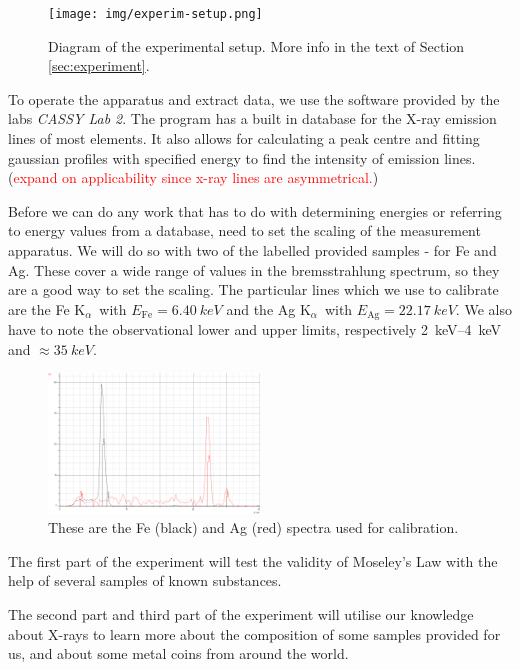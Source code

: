 \documentclass[11pt,a4paper,twoside,onecolumn]{article}
\newcommand{\reminder}[1]{\textcolor{red}{#1}}
\newcommand{\Kalpha}{$\mathrm{K}_\alpha$~}
\begin{document}
\begin{figure}[!htbp]
    \centering
    \texttt{[image: img/experim-setup.png]}
    \caption{Diagram of the experimental setup. More info in the text of Section \ref{sec:experiment}.}\label{fig:experim-setup}
\end{figure}

To operate the apparatus and extract data, we use the software provided by the labs \emph{CASSY Lab 2}. The program has a built in database for the X-ray emission lines of most elements. It also allows for calculating a peak centre and fitting gaussian profiles with specified energy to find the intensity of emission lines. (\reminder{expand on applicability since x-ray lines are asymmetrical.})

Before we can do any work that has to do with determining energies or referring to energy values from a database, need to set the scaling of the measurement apparatus. We will do so with two of the labelled provided samples - for Fe and Ag. These cover a wide range of values in the bremsstrahlung spectrum, so they are a good way to set the scaling. The particular lines which we use to calibrate are the Fe \Kalpha with $E_\mathrm{Fe} = \qty{6.40}{keV}$ and the Ag \Kalpha with $E_\mathrm{Ag} = \qty{22.17}{keV}$. We also have to note the observational lower and upper limits, respectively \qtyrange{2}{4}{keV} and $\approx \qty{35}{keV}$.

\begin{figure}[!htbp]
    \centering
    \includegraphics[width=0.5\textwidth]{img/calib.png}
    \caption{These are the Fe (black) and Ag (red) spectra used for calibration.}\label{fig:calibration}
\end{figure}

The first part of the experiment will test the validity of Moseley's Law with the help of several samples of known substances.

The second part and third part of the experiment will utilise our knowledge about X-rays to learn more about the composition of some samples provided for us, and about some metal coins from around the world.
\end{document}
